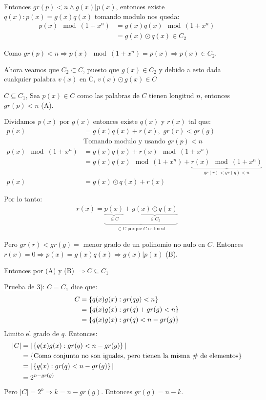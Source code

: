 \documentclass[12pt,a4paper]{article}
\begin{document}
Entonces $gr(p)<n \wedge g(x)|p(x)$, entonces existe $q(x): p(x) = g(x)q(x)$
tomando modulo nos queda:
\begin{align*}
    p(x) \mod (1+x^{n}) &= g(x)q(x)\mod (1+x^{n})\\
    &= g(x) \odot q(x) \in C_{2}
\end{align*}

Como $gr(p) < n \Rightarrow p(x) \mod (1+x^{n}) = p(x) \Rightarrow p(x) \in C_{2}$.
\medskip

Ahora veamos que $C_{2} \subset C$, puesto que $g(x) \in C_{2}$ y debido a esto dada 
cualquier palabra $v(x)$ en C, $v(x) \odot g(x) \in C$
\medskip

$C \subseteq C_{1}$, Sea $p(x) \in C$ como las palabras de $C$ tienen longitud $n$, 
entonces $gr(p) < n$ (A).
\medskip

Dividamos $p(x)$ por $g(x)$ entonces existe $q(x)$ y $r(x)$ tal que:
\begin{align*}
    p(x) &= g(x)q(x) + r(x), \,\, gr(r) < gr(g)\\
    &\text{Tomando modulo y usando $gr(p)<n$}\\
    p(x) \mod (1+x^{n}) &= g(x)q(x) + r(x) \mod (1+x^{n})\\
    &= g(x)q(x) \mod (1+x^{n}) + \underbrace{r(x) \mod (1+x^{n})}_{gr(r)<gr(g)<n}\\
    p(x) &= g(x) \odot q(x) + r(x)
\end{align*}

Por lo tanto:
\begin{align*}
    r(x) = \underbrace{\underbrace{p(x)}_{\in C} + \underbrace{g(x) \odot q(x)}_{\in C_{2}}}_{\in C\,\,\text{porque $C$ es lineal}}
\end{align*}

Pero $gr(r) < gr(g) = \,\,\text{menor grado de un polinomio no nulo en $C$}$. 
Entonces $r(x) = 0 \Rightarrow p(x) = g(x)q(x) \Rightarrow g(x)|p(x)$ (B).
\medskip

Entonces por (A) y (B) $\Rightarrow C \subseteq C_{1}$
\medskip

\underline{Prueba de 3):} $C = C_{1}$ dice que:
\begin{align*}
    C &= \left\lbrace q(x)g(x): gr(qg)<n \right\rbrace \\
    &= \left\lbrace q(x)g(x): gr(q)+gr(g)<n \right\rbrace \\
    &= \left\lbrace q(x)g(x): gr(q)<n-gr(g) \right\rbrace \\
\end{align*}
Limito el grado de $q$. Entonces:
\begin{align*}
    |C| &= |\left\lbrace q(x)g(x):gr(q) < n-gr(g) \right\rbrace|\\
    &= \left\lbrace \text{Como conjunto no son iguales, pero tienen la misma $\#$ de elementos} \right\rbrace\\
    &= |\left\lbrace q(x):gr(q)<n-gr(g) \right\rbrace|\\
    &= 2^{n-gr(g)}\\
\end{align*}
Pero $|C| = 2^{k} \Rightarrow k = n- gr(g)$. Entonces $gr(g) = n-k$.
\medskip
\end{document}
